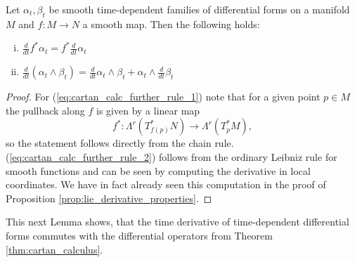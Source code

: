 \begin{lemma}
    \label{lem:cartan_calculus_further_rules}
    Let $\alpha_t, \beta_t$ be smooth time-dependent families of differential forms on a manifold $M$ and $f \colon M \to N$ a smooth map. Then the following holds:
    \begin{enumerate}[(i)]
        \item $\frac{d}{d t}f^*\alpha_t = f^*\frac{d}{d t} \alpha_t$ \label{eq:cartan_calc_further_rule_1}
        \item $\frac{d}{dt}(\alpha_t\wedge \beta_t) = \frac{d}{dt}\alpha_t \wedge \beta_t + \alpha_t \wedge \frac{d}{dt}\beta_t$ \label{eq:cartan_calc_further_rule_2}
    \end{enumerate} 
\end{lemma}
\begin{proof}
    For (\ref{eq:cartan_calc_further_rule_1}) note that for a given point $p\in M$ the pullback along $f$ is given by a linear map
    \[
        f^\ast \colon\Lambda^r(T_{f(p)}^\ast N) \to \Lambda^r(T_{p}^\ast M),
    \] 
    so the statement follows directly from the chain rule. (\ref{eq:cartan_calc_further_rule_2}) follows from the ordinary Leibniz rule for smooth functions and can be seen by computing the derivative in local coordinates. We have in fact already seen this computation in the proof of Proposition \ref{prop:lie_derivative_properties}.
\end{proof}

This next Lemma shows, that the time derivative of time-dependent differential forms commutes with the differential operators from Theorem \ref{thm:cartan_calculus}.

